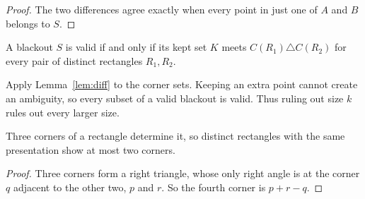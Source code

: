 \begin{proof}
The two differences agree exactly when every point in just one of $A$ and $B$
belongs to $S$.
\end{proof}

\begin{corollary}\label{cor:hitting}
A blackout $S$ is valid if and only if its kept set $K$ meets
$C(R_1)\triangle C(R_2)$ for every pair of distinct rectangles $R_1,R_2$.
\end{corollary}

Apply Lemma~\ref{lem:diff} to the corner sets. Keeping an extra point cannot
create an ambiguity, so every subset of a valid blackout is valid.
Thus ruling out size $k$ rules out every larger size.

\begin{lemma}\label{lem:threecorners}
Three corners of a rectangle determine it, so distinct rectangles with the same
presentation show at most two corners.
\end{lemma}

\begin{proof}
Three corners form a right triangle, whose only right angle is at the corner $q$ adjacent
to the other two, $p$ and $r$. So the fourth corner is $p+r-q$.
\end{proof}
